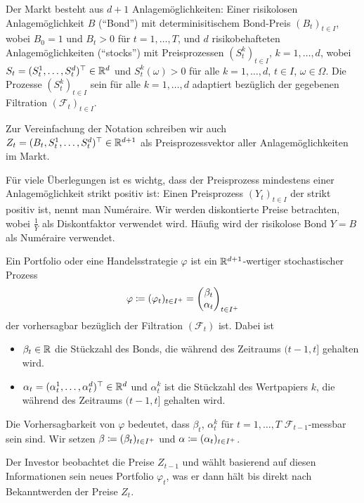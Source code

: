 \documentclass[a4paper,twoside,DIV15,BCOR12mm]{scrbook}
\newcommand{\cF}{\mathcal F}
\begin{document}
Der Markt besteht aus $d+1$ Anlagemöglichkeiten: Einer risikolosen Anlagemöglichkeit $B$ (“Bond”) mit determinisitischem Bond-Preis $(B_t)_{t\in I}$, wobei $B_0=1$ und $B_t>0$ für $t=1,\ldots,T$, und $d$ risikobehafteten Anlagemöglichkeiten (“stocks”) mit Preisprozessen $(S_t^k)_{t\in I}$, $k=1,\ldots,d$, wobei $S_t=(S_t^1,\ldots,S_t^d)^\top\in \mathbb{R}^d$ und $S_t^k(\omega)>0$ für alle $k=1,\ldots,d$, $t\in I$, $\omega\in \Omega$. Die Prozesse $(S_t^k)_{t\in I}$ sein für alle $k=1,\ldots,d$ adaptiert bezüglich der gegebenen Filtration $(\cF_t)_{t\in I}$.

Zur Vereinfachung der Notation schreiben wir auch $Z_t = (B_t, S_t^1, \ldots , S_t^d)^\top\in\mathbb{R}^{d+1}$ als Preisprozessvektor aller Anlagemöglichkeiten im Markt.

Für viele Überlegungen ist es wichtg, dass der Preisprozess mindestens einer Anlagemöglichkeit strikt positiv ist:  Einen Preisprozess $(Y_t)_{t\in I}$ der strikt positiv ist, nennt man Numéraire. Wir werden diskontierte Preise betrachten, wobei $\frac 1Y$ als Diskontfaktor verwendet wird. Häufig wird der risikolose Bond $Y=B$ als Numéraire verwendet.

\begin{definition}
Ein Portfolio oder eine Handelsstrategie $\varphi$ ist ein $\mathbb{R}^{d+1}$-wertiger stochastischer Prozess 
\[
\varphi \da (\varphi_t)_{t\in I^+} = 
\begin{pmatrix}
\beta_t \\ \alpha _t
\end{pmatrix}_{t\in I^+}
\]
der vorhersagbar bezüglich der Filtration $(\cF_t)$ ist. Dabei ist
\begin{itemize}
\item $\beta_t\in\mathbb{R}$ die Stückzahl des Bonds, die während des Zeitraums $(t-1,t]$ gehalten wird.
\item $\alpha_t = (\alpha_t^1,\ldots, \alpha_t^d)^\top \in\mathbb{R}^d$ und $\alpha_t^k$ ist die Stückzahl des Wertpapiers $k$, die während des Zeitraums $(t-1,t]$ gehalten wird.
\end{itemize}
Die Vorhersagbarkeit von $\varphi$ bedeutet, dass $\beta_t$, $\alpha_t^k$ für $t=1,\ldots,T$ $\cF_{t-1}$-messbar sein sind. Wir setzen
$\beta \da (\beta_t)_{t\in I^+}$ und $\alpha \da (\alpha_t)_{t\in I^+}$.
\end{definition}

Der Investor beobachtet die Preise $Z_{t-1}$ und wählt basierend auf diesen Informationen sein neues Portfolio $\varphi_t$, was er dann hält bis direkt nach Bekanntwerden der Preise $Z_t$.
\end{document}
